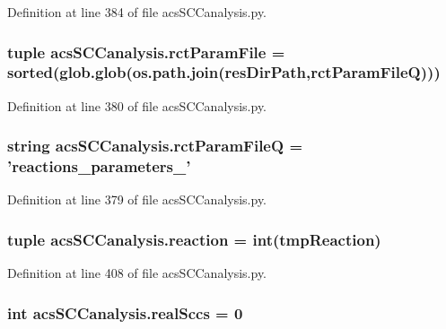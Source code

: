 Definition at line 384 of file acs\-S\-C\-Canalysis.\-py.

\hypertarget{a00102_ac700504fc38d7684ec9fae104d7d90a3}{
\subsubsection[{rct\-Param\-File}]{\setlength{\rightskip}{0pt plus 5cm}tuple acs\-S\-C\-Canalysis.\-rct\-Param\-File = sorted(glob.\-glob(os.\-path.\-join({\bf res\-Dir\-Path},{\bf rct\-Param\-File\-Q})))}}\label{a00102_ac700504fc38d7684ec9fae104d7d90a3}


Definition at line 380 of file acs\-S\-C\-Canalysis.\-py.

\hypertarget{a00102_aff5ea475bb2c78122a231a915dc88e89}{
\subsubsection[{rct\-Param\-File\-Q}]{\setlength{\rightskip}{0pt plus 5cm}string acs\-S\-C\-Canalysis.\-rct\-Param\-File\-Q = 'reactions\-\_\-parameters\-\_\-'}}\label{a00102_aff5ea475bb2c78122a231a915dc88e89}


Definition at line 379 of file acs\-S\-C\-Canalysis.\-py.

\hypertarget{a00102_a58c3618ec28f27dfbf09e0d3aba05bc7}{
\subsubsection[{reaction}]{\setlength{\rightskip}{0pt plus 5cm}tuple acs\-S\-C\-Canalysis.\-reaction = int(tmp\-Reaction)}}\label{a00102_a58c3618ec28f27dfbf09e0d3aba05bc7}


Definition at line 408 of file acs\-S\-C\-Canalysis.\-py.

\hypertarget{a00102_ac6aaa0ac5d13b0736ab3179dc1ed388d}{
\subsubsection[{real\-Sccs}]{\setlength{\rightskip}{0pt plus 5cm}int acs\-S\-C\-Canalysis.\-real\-Sccs = 0}}\label{a00102_ac6aaa0ac5d13b0736ab3179dc1ed388d}


